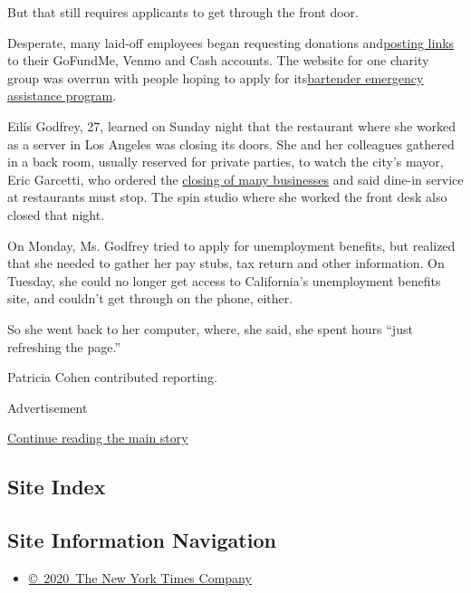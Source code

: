 But that still requires applicants to get through the front door.

Desperate, many laid-off employees began requesting donations
and\href{https://twitter.com/Whatapityonyou/status/1239639173843136512?s=20}{posting
links} to their GoFundMe, Venmo and Cash accounts. The website for one
charity group was overrun with people hoping to apply for
its\href{https://www.usbgfoundation.org/beap}{bartender emergency
assistance program}.

Eilís Godfrey, 27, learned on Sunday night that the restaurant where she
worked as a server in Los Angeles was closing its doors. She and her
colleagues gathered in a back room, usually reserved for private
parties, to watch the city's mayor, Eric Garcetti, who ordered the
\href{https://twitter.com/MayorOfLA/status/1239387832554106881?ref_src=twsrc\%5Etfw\%7Ctwcamp\%5Etweetembed\%7Ctwterm\%5E1239387832554106881\&ref_url=https\%3A\%2F\%2Fla.eater.com\%2F2020\%2F3\%2F15\%2F21180760\%2Flos-angeles-bar-restaurant-shutdown-order}{closing
of many businesses} and said dine-in service at restaurants must stop.
The spin studio where she worked the front desk also closed that night.

On Monday, Ms. Godfrey tried to apply for unemployment benefits, but
realized that she needed to gather her pay stubs, tax return and other
information. On Tuesday, she could no longer get access to California's
unemployment benefits site, and couldn't get through on the phone,
either.

So she went back to her computer, where, she said, she spent hours
``just refreshing the page.''

Patricia Cohen contributed reporting.

Advertisement

\protect\hyperlink{after-bottom}{Continue reading the main story}

\hypertarget{site-index}{%
\subsection{Site Index}\label{site-index}}

\hypertarget{site-information-navigation}{%
\subsection{Site Information
Navigation}\label{site-information-navigation}}

\begin{itemize}
\tightlist
\item
  \href{https://help.nytimes.com/hc/en-us/articles/115014792127-Copyright-notice}{©~2020~The
  New York Times Company}
\end{itemize}

